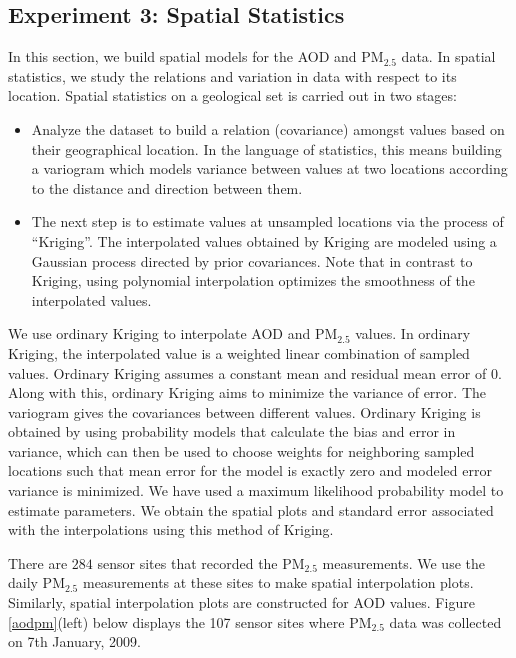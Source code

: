 \documentclass[10pt]{article}
\begin{document}
\subsection{Experiment 3: Spatial Statistics}
In this section, we build spatial models for the AOD and PM$_{2.5}$ data. In spatial
statistics, we study the relations and variation in data with respect to its
location. Spatial statistics on a geological set is carried out in two stages:

\begin{itemize}
\item Analyze the dataset to build a relation (covariance) amongst values based
on their geographical location. In the language of statistics, this means
building a variogram which models variance between values at two locations
according to the distance and direction between them.

\item The next step is to estimate values at unsampled locations via 
the process of ``Kriging''. The interpolated values obtained by Kriging are modeled
using a Gaussian process directed by prior covariances. Note that in contrast to Kriging,
using polynomial interpolation optimizes the smoothness of the interpolated values.  

\end{itemize}

We use ordinary Kriging to interpolate AOD and PM$_{2.5}$ values. In ordinary
Kriging, the interpolated value is a weighted linear combination of sampled
values. Ordinary Kriging assumes a constant mean and residual mean error of 0.
Along with this, ordinary Kriging aims to minimize the variance of error. The
variogram gives the covariances between different values. Ordinary Kriging is
obtained by using probability models that calculate the bias and error in
variance, which can then be used to choose weights for neighboring sampled
locations such that mean error for the model is exactly zero and modeled error
variance is minimized. We have used a maximum likelihood probability model to
estimate parameters. We obtain the spatial plots and standard error associated
with the interpolations using this method of Kriging. 

There are $284$ sensor sites that recorded the PM$_{2.5}$ measurements. We use
the daily  PM$_{2.5}$ measurements at these sites to make spatial interpolation
plots. Similarly, spatial interpolation plots are constructed for AOD values.
Figure \ref{aodpm}(left)  below displays the 107 sensor sites where PM$_{2.5}$ data
was collected on 7th January, 2009. 
\end{document}
